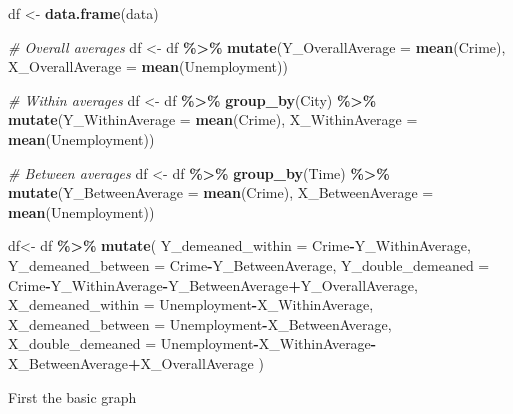 \documentclass[
]{book}
\newenvironment{Shaded}{\begin{snugshade}}{\end{snugshade}}
\newcommand{\AttributeTok}[1]{\textcolor[rgb]{0.13,0.29,0.53}{#1}}
\newcommand{\CommentTok}[1]{\textcolor[rgb]{0.56,0.35,0.01}{\textit{#1}}}
\newcommand{\FunctionTok}[1]{\textcolor[rgb]{0.13,0.29,0.53}{\textbf{#1}}}
\newcommand{\NormalTok}[1]{#1}
\newcommand{\OtherTok}[1]{\textcolor[rgb]{0.56,0.35,0.01}{#1}}
\newcommand{\SpecialCharTok}[1]{\textcolor[rgb]{0.81,0.36,0.00}{\textbf{#1}}}
\begin{document}
\begin{Shaded}
\begin{Highlighting}[]
\NormalTok{df }\OtherTok{\textless{}{-}} \FunctionTok{data.frame}\NormalTok{(data)}

\CommentTok{\# Overall averages}
\NormalTok{df }\OtherTok{\textless{}{-}}\NormalTok{ df }\SpecialCharTok{\%\textgreater{}\%}
  \FunctionTok{mutate}\NormalTok{(}\AttributeTok{Y\_OverallAverage =} \FunctionTok{mean}\NormalTok{(Crime),}
         \AttributeTok{X\_OverallAverage =} \FunctionTok{mean}\NormalTok{(Unemployment))}

\CommentTok{\# Within averages         }
\NormalTok{df }\OtherTok{\textless{}{-}}\NormalTok{ df }\SpecialCharTok{\%\textgreater{}\%}
  \FunctionTok{group\_by}\NormalTok{(City) }\SpecialCharTok{\%\textgreater{}\%}
  \FunctionTok{mutate}\NormalTok{(}\AttributeTok{Y\_WithinAverage =} \FunctionTok{mean}\NormalTok{(Crime), }
         \AttributeTok{X\_WithinAverage =} \FunctionTok{mean}\NormalTok{(Unemployment))       }

\CommentTok{\# Between averages}
\NormalTok{df }\OtherTok{\textless{}{-}}\NormalTok{ df }\SpecialCharTok{\%\textgreater{}\%}
  \FunctionTok{group\_by}\NormalTok{(Time) }\SpecialCharTok{\%\textgreater{}\%}
  \FunctionTok{mutate}\NormalTok{(}\AttributeTok{Y\_BetweenAverage =} \FunctionTok{mean}\NormalTok{(Crime), }
         \AttributeTok{X\_BetweenAverage =} \FunctionTok{mean}\NormalTok{(Unemployment))}
         
\NormalTok{df}\OtherTok{\textless{}{-}}\NormalTok{ df }\SpecialCharTok{\%\textgreater{}\%}
  \FunctionTok{mutate}\NormalTok{( }\AttributeTok{Y\_demeaned\_within =}\NormalTok{ Crime}\SpecialCharTok{{-}}\NormalTok{Y\_WithinAverage,}
          \AttributeTok{Y\_demeaned\_between =}\NormalTok{ Crime}\SpecialCharTok{{-}}\NormalTok{Y\_BetweenAverage,}
          \AttributeTok{Y\_double\_demeaned =}\NormalTok{ Crime}\SpecialCharTok{{-}}\NormalTok{Y\_WithinAverage}\SpecialCharTok{{-}}\NormalTok{Y\_BetweenAverage}\SpecialCharTok{+}\NormalTok{Y\_OverallAverage,}
          \AttributeTok{X\_demeaned\_within =}\NormalTok{ Unemployment}\SpecialCharTok{{-}}\NormalTok{X\_WithinAverage,}
          \AttributeTok{X\_demeaned\_between =}\NormalTok{ Unemployment}\SpecialCharTok{{-}}\NormalTok{X\_BetweenAverage,}
          \AttributeTok{X\_double\_demeaned =}\NormalTok{ Unemployment}\SpecialCharTok{{-}}\NormalTok{X\_WithinAverage}\SpecialCharTok{{-}}\NormalTok{X\_BetweenAverage}\SpecialCharTok{+}\NormalTok{X\_OverallAverage}
\NormalTok{        )}
\end{Highlighting}
\end{Shaded}

First the basic graph
\end{document}
